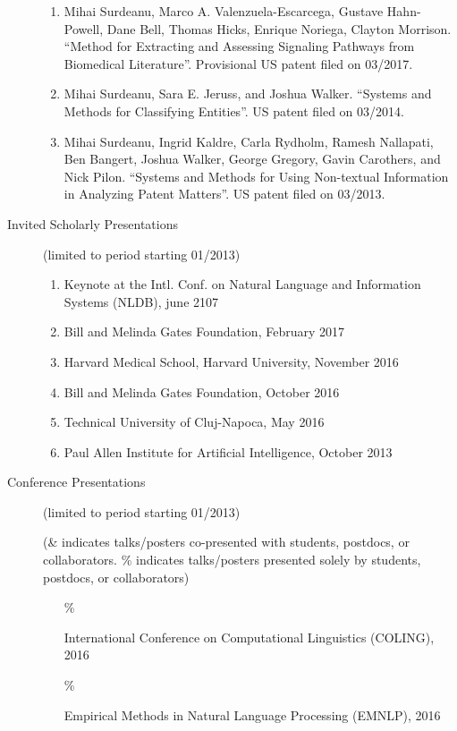 \documentclass[10pt]{article}
\newcommand{\ti}[1]{``#1''} %
\newcommand{\lmt}{(limited to period starting 01/2013)}
\begin{document}
\begin{description}
\begin{enumerate}
\item 
Mihai Surdeanu, Marco A. Valenzuela-Escarcega, Gustave Hahn-Powell, Dane Bell, Thomas Hicks, Enrique Noriega, Clayton Morrison. \ti{Method for Extracting and Assessing Signaling Pathways from Biomedical Literature}. Provisional US patent filed on 03/2017.

\item 
Mihai Surdeanu, Sara E. Jeruss, and Joshua Walker. \ti{Systems and Methods for Classifying Entities}. US patent filed on 03/2014. 

\item 
Mihai Surdeanu, Ingrid Kaldre, Carla Rydholm, Ramesh Nallapati, Ben Bangert, Joshua Walker, George Gregory, Gavin Carothers, and Nick Pilon. \ti{Systems and Methods for Using Non-textual Information in Analyzing Patent Matters}. US patent filed on 03/2013.

\end{enumerate}


\item [Invited Scholarly Presentations] \lmt \
\begin{enumerate}

\item Keynote at the Intl. Conf. on Natural Language and Information Systems (NLDB), june 2107
\item Bill and Melinda Gates Foundation, February 2017
\item Harvard Medical School, Harvard University, November 2016
\item Bill and Melinda Gates Foundation, October 2016
\item Technical University of Cluj-Napoca, May 2016
\item Paul Allen Institute for Artificial Intelligence, October 2013
\end{enumerate}

\item [Conference Presentations] \lmt \

(\& indicates talks/posters co-presented with students, postdocs, or collaborators. \% indicates talks/posters presented solely by students, postdocs, or collaborators)


\begin{enumerate}

\item 
[\% \addtocounter{enumi}{1}\theenumi ]
International Conference on Computational Linguistics (COLING), 2016

\item 
[\% \addtocounter{enumi}{1}\theenumi ]
Empirical Methods in Natural Language Processing (EMNLP), 2016


\end{enumerate}
\end{description}
\end{document}

